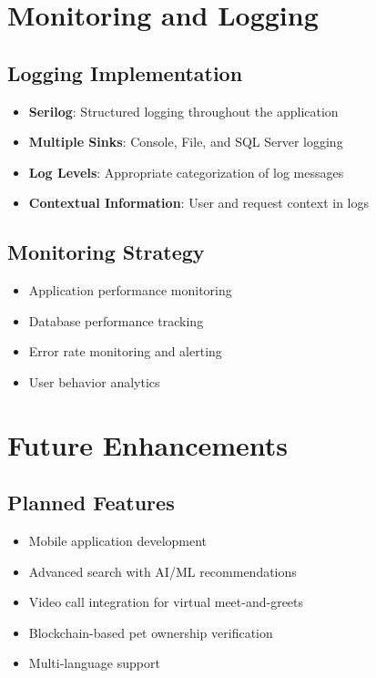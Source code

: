 \documentclass[12pt,a4paper]{article}
\begin{document}
\section{Monitoring and Logging}

\subsection{Logging Implementation}

\begin{itemize}
    \item \textbf{Serilog}: Structured logging throughout the application
    \item \textbf{Multiple Sinks}: Console, File, and SQL Server logging
    \item \textbf{Log Levels}: Appropriate categorization of log messages
    \item \textbf{Contextual Information}: User and request context in logs
\end{itemize}

\subsection{Monitoring Strategy}

\begin{itemize}
    \item Application performance monitoring
    \item Database performance tracking
    \item Error rate monitoring and alerting
    \item User behavior analytics
\end{itemize}

\section{Future Enhancements}

\subsection{Planned Features}

\begin{itemize}
    \item Mobile application development
    \item Advanced search with AI/ML recommendations
    \item Video call integration for virtual meet-and-greets
    \item Blockchain-based pet ownership verification
    \item Multi-language support
\end{itemize}
\end{document}
